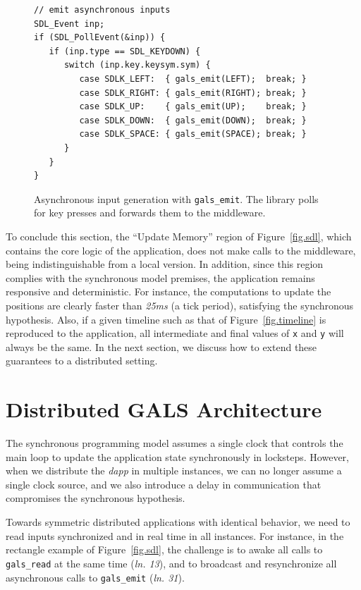 \documentclass[sigplan,screen]{acmart}
\newcommand{\lin}[1]{(\emph{ln. #1}\xspace)}
\newcommand{\dapp}{\emph{dapp}\xspace}
\begin{document}
\begin{figure}[t]
{\scriptsize
\begin{verbatim}
// emit asynchronous inputs
SDL_Event inp;
if (SDL_PollEvent(&inp)) {
   if (inp.type == SDL_KEYDOWN) {
      switch (inp.key.keysym.sym) {
         case SDLK_LEFT:  { gals_emit(LEFT);  break; }
         case SDLK_RIGHT: { gals_emit(RIGHT); break; }
         case SDLK_UP:    { gals_emit(UP);    break; }
         case SDLK_DOWN:  { gals_emit(DOWN);  break; }
         case SDLK_SPACE: { gals_emit(SPACE); break; }
      }
   }
}
\end{verbatim}
}
  \caption{
    \label{fig.input}
    Asynchronous input generation with \texttt{gals\_emit}.
    The library polls for key presses and forwards them to the middleware.
  }
\end{figure}

To conclude this section, the ``Update Memory'' region of Figure~\ref{fig.sdl},
which contains the core logic of the application, does not make calls to the
middleware, being indistinguishable from a local version.
In addition, since this region complies with the synchronous model premises,
the application remains responsive and deterministic.
For instance, the computations to update the positions are clearly faster than
\emph{25ms} (a tick period), satisfying the synchronous hypothesis.
Also, if a given timeline such as that of Figure~\ref{fig.timeline} is
reproduced to the application, all intermediate and final values of \texttt{x}
and \texttt{y} will always be the same.
In the next section, we discuss how to extend these guarantees to a distributed
setting.

\section{Distributed GALS Architecture}
\label{sec.gals}

The synchronous programming model assumes a single clock that controls the main
loop to update the application state synchronously in locksteps.
However, when we distribute the \dapp in multiple instances, we can no longer
assume a single clock source, and we also introduce a delay in communication
that compromises the synchronous hypothesis.

Towards symmetric distributed applications with identical behavior, we need to
read inputs synchronized and in real time in all instances.
For instance, in the rectangle example of Figure~\ref{fig.sdl}, the challenge
is
    to awake all calls to \texttt{gals\_read} at the same time \lin{13}, and
    to broadcast and resynchronize all asynchronous calls to \texttt{gals\_emit} \lin{31}.
\end{document}
